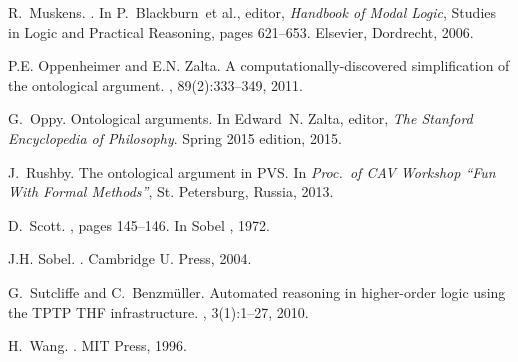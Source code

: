 \documentclass{llncs}
\begin{document}
\begin{thebibliography}{10}
R.~Muskens.
.
\newblock In P.~Blackburn~et al., editor, {\em Handbook of Modal Logic},
  Studies in Logic and Practical Reasoning, pages 621--653. Elsevier,
  Dordrecht, 2006.

P.E. Oppenheimer and E.N. Zalta.
\newblock A computationally-discovered simplification of the ontological
  argument.
, 89(2):333--349, 2011.

G.~Oppy.
\newblock Ontological arguments.
\newblock In Edward~N. Zalta, editor, {\em The Stanford Encyclopedia of
  Philosophy}. Spring 2015 edition, 2015.

J.~Rushby.
\newblock The ontological argument in {PVS}.
\newblock In {\em Proc.~of CAV Workshop ``Fun With Formal Methods''}, St.
  Petersburg, Russia, 2013.

D.~Scott.
, pages 145--146.
\newblock In Sobel \cite{sobel2004logic}, 1972.

J.H. Sobel.
.
\newblock Cambridge U. Press, 2004.

G.~Sutcliffe and C.~Benzm{\"u}ller.
\newblock Automated reasoning in higher-order logic using the {TPTP THF}
  infrastructure.
, 3(1):1--27, 2010.

H.~Wang.
.
\newblock MIT Press, 1996.

\end{thebibliography}
\end{document}
